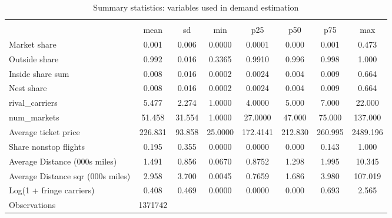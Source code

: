 \begin{table}[htbp]\centering
\def\sym#1{\ifmmode^{#1}\else\(^{#1}\)\fi}
\caption{Summary statistics: variables used in demand estimation}
\begin{tabular}{l*{1}{ccccccc}}
\toprule
                    &\multicolumn{7}{c}{}                                                                      \\
                    &        mean&          sd&         min&         p25&         p50&         p75&         max\\
\midrule
Market share        &       0.001&       0.006&      0.0000&      0.0001&       0.000&       0.001&       0.473\\
Outside share       &       0.992&       0.016&      0.3365&      0.9910&       0.996&       0.998&       1.000\\
Inside share sum    &       0.008&       0.016&      0.0002&      0.0024&       0.004&       0.009&       0.664\\
Nest share          &       0.008&       0.016&      0.0002&      0.0024&       0.004&       0.009&       0.664\\
rival\_carriers      &       5.477&       2.274&      1.0000&      4.0000&       5.000&       7.000&      22.000\\
num\_markets         &      51.458&      31.554&      1.0000&     27.0000&      47.000&      75.000&     137.000\\
Average ticket price&     226.831&      93.858&     25.0000&    172.4141&     212.830&     260.995&    2489.196\\
Share nonstop flights &       0.195&       0.355&      0.0000&      0.0000&       0.000&       0.143&       1.000\\
Average Distance (000s miles)&       1.491&       0.856&      0.0670&      0.8752&       1.298&       1.995&      10.345\\
Average Distance sqr (000s miles)&       2.958&       3.700&      0.0045&      0.7659&       1.686&       3.980&     107.019\\
Log(1 + fringe carriers)&       0.408&       0.469&      0.0000&      0.0000&       0.000&       0.693&       2.565\\
\midrule
Observations        &     1371742&            &            &            &            &            &            \\
\bottomrule
\end{tabular}
\end{table}
